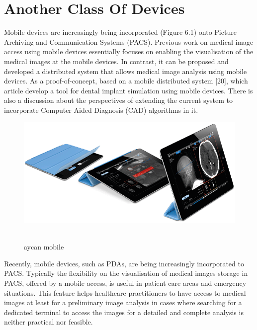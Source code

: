 
\chapter{Another Class Of Devices}
\label{chapter:devices}

Mobile devices are increasingly being incorporated (Figure 6.1) onto Picture Archiving and Communication Systems (PACS). Previous work on medical image access using mobile devices essentially focuses on enabling the visualisation of the medical images at the mobile devices. In contrast, it can be proposed and developed a distributed system that allows medical image analysis using mobile devices. As a proof-of-concept, based on a mobile distributed system [20], which article develop a tool for dental implant simulation using mobile devices. There is also a discussion about the perspectives of extending the current system to incorporate Computer Aided Diagnosis (CAD) algorithms in it.

\begin{figure}[!hbt]
\centering
\includegraphics[width=15cm]{images/mobile}~\\
\caption{\label{fig:frog}aycan mobile
}
\end{figure}

Recently, mobile devices, such as PDAs, are being increasingly incorporated to PACS. Typically the flexibility on the visualisation of medical images storage in PACS, offered by a mobile access, is useful in patient care areas and emergency situations. This feature helps healthcare practitioners to have access to medical images at least for a preliminary image analysis in cases where searching for a dedicated terminal to access the images for a detailed and complete analysis is neither practical nor feasible.

\clearpage

